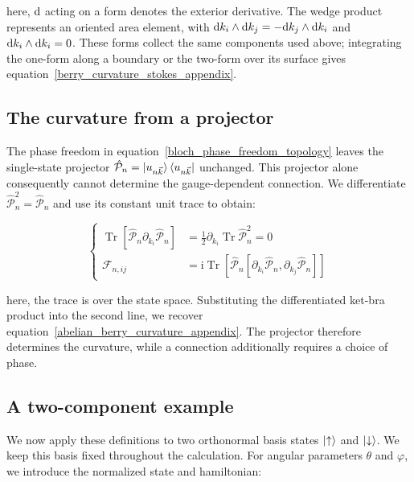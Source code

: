 here, $\mathrm{d}$ acting on a form denotes the exterior derivative.
The wedge product represents an oriented area element, with
$\mathrm{d} k_i\wedge\mathrm{d} k_j=-\mathrm{d} k_j\wedge\mathrm{d} k_i$ and $\mathrm{d} k_i\wedge\mathrm{d} k_i=0$.
These forms collect the same components used above;
integrating the one-form along a boundary or the two-form over its surface gives equation~\eqref{berry_curvature_stokes_appendix}.

\FloatBarrier
\subsection{The curvature from a projector}

The phase freedom in equation~\eqref{bloch_phase_freedom_topology} leaves the single-state projector
$\hat{\mathcal{P}}_n=\ket{u_{n\vec{k}}}\bra{u_{n\vec{k}}}$ unchanged.
This projector alone consequently cannot determine the gauge-dependent connection.
We differentiate $\hat{\mathcal{P}}_n^2=\hat{\mathcal{P}}_n$ and use its constant unit trace to obtain:

\begin{equation}
\left\{\begin{aligned}
    \operatorname{Tr}\!\left[\hat{\mathcal{P}}_n\partial_{k_i}\hat{\mathcal{P}}_n\right]
    &=\frac{1}{2}\partial_{k_i}\operatorname{Tr}\hat{\mathcal{P}}_n^2=0 \\
    \mathcal{F}_{n,ij}
    &=\mathrm{i}\operatorname{Tr}\!\left[
    \hat{\mathcal{P}}_n[\partial_{k_i}\hat{\mathcal{P}}_n,\partial_{k_j}\hat{\mathcal{P}}_n]\right]
\end{aligned}\right.
\label{projector_berry_curvature_appendix}
\end{equation}

here, the trace is over the state space.
Substituting the differentiated ket-bra product into the second line, we recover equation~\eqref{abelian_berry_curvature_appendix}.
The projector therefore determines the curvature, while a connection additionally requires a choice of phase.

\FloatBarrier
\subsection{A two-component example}
\label{subsec:berry_two_component_example_appendix}

We now apply these definitions to two orthonormal basis states $\ket{\uparrow}$ and $\ket{\downarrow}$.
We keep this basis fixed throughout the calculation.
For angular parameters $\theta$ and $\varphi$, we introduce the normalized state and hamiltonian:

